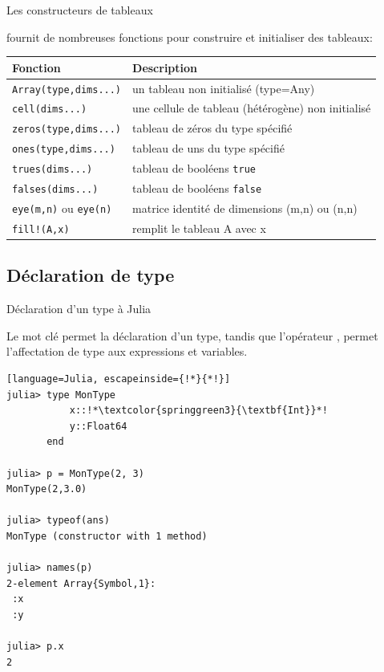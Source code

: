 \begin{frame}[containsverbatim]{Les constructeurs de tableaux}
\par{{\Julia} fournit de nombreuses fonctions pour construire et initialiser des tableaux:}
\begin{table}
{\small\begin{tabular}{ll}
Fonction & Description\\
\hline
\texttt{Array(type,dims...)} & un tableau non initialisé (type=Any)\\
\texttt{cell(dims...)} & une cellule de tableau (hétérogène) non initialisé\\
\texttt{zeros(type,dims...)} & tableau de zéros du type spécifié\\
\texttt{ones(type,dims...)} & tableau de uns du type spécifié\\
\texttt{trues(dims...)} & tableau de booléens \texttt{true}\\
\texttt{falses(dims...)} &  tableau de booléens \texttt{false}\\
\texttt{eye(m,n)} ou \texttt{eye(n)} & matrice identité de dimensions (m,n) ou (n,n)\\
\texttt{fill\hspace{-0.5ex}!(A,x)} & remplit le tableau A avec x\\
\end{tabular}}
\end{table}
\end{frame}


\subsection{Déclaration de type}
\begin{frame}[containsverbatim]{Déclaration d'un type à Julia}
\par{Le mot clé  permet la déclaration d'un type,
tandis que l'opérateur \cmdb{\hspace{-1.5ex}:\hspace{-1.5ex}:},
permet l'affectation de type aux expressions et variables.}
\begin{lstlisting}[language=Julia, escapeinside={!*}{*!}]
julia> type MonType
           x::!*\textcolor{springgreen3}{\textbf{Int}}*!
           y::Float64
       end

julia> p = MonType(2, 3)
MonType(2,3.0)

julia> typeof(ans)
MonType (constructor with 1 method)

julia> names(p)
2-element Array{Symbol,1}:
 :x
 :y

julia> p.x
2
\end{lstlisting}
\end{frame}


